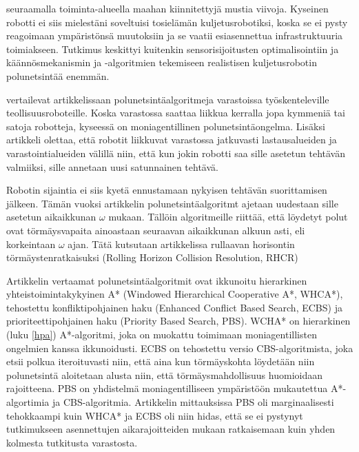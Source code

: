 seuraamalla toiminta-alueella maahan kiinnitettyjä mustia viivoja. Kyseinen 
robotti ei siis mielestäni soveltuisi tosielämän kuljetusrobotiksi, koska se 
ei pysty reagoimaan ympäristönsä muutoksiin ja se vaatii esiasennettua 
infrastruktuuria toimiakseen. Tutkimus keskittyi kuitenkin sensorisijoitusten 
optimalisointiin ja käännösmekanismin ja -algoritmien tekemiseen realistisen 
kuljetusrobotin polunetsintää enemmän. \par
	\textcite{warehouse} vertailevat artikkelissaan 
polunetsintäalgoritmeja varastoissa työskenteleville teollisuusroboteille. 
Koska varastossa saattaa liikkua kerralla jopa kymmeniä tai satoja robotteja, 
kyseessä on moniagentillinen polunetsintäongelma. Lisäksi artikkeli olettaa, 
että robotit liikkuvat varastossa jatkuvasti lastausalueiden ja 
varastointialueiden välillä niin, että kun jokin robotti saa sille asetetun 
tehtävän valmiiksi, sille annetaan uusi satunnainen tehtävä. \par
	Robotin sijaintia ei siis kyetä ennustamaan nykyisen tehtävän 
suorittamisen jälkeen. Tämän vuoksi artikkelin polunetsintäalgoritmt ajetaan 
uudestaan sille asetetun aikaikkunan $\omega$ mukaan. Tällöin algoritmeille 
riittää, että löydetyt polut ovat törmäysvapaita ainoastaan seuraavan 
aikaikkunan alkuun asti, eli korkeintaan $\omega$ ajan. Tätä kutsutaan 
artikkelissa rullaavan horisontin törmäystenratkaisuksi (Rolling Horizon 
Collision Resolution, RHCR) \par
	Artikkelin vertaamat polunetsintäalgoritmit ovat ikkunoitu 
hierarkinen yhteistoimintakykyinen A* (Windowed Hierarchical Cooperative A*, 
WHCA*), tehostettu konfliktipohjainen haku (Enhanced Conflict Based Search, 
ECBS) ja prioriteettipohjainen haku (Priority Based Search, PBS). WCHA* on 
hierarkinen (luku \ref{hpa}) A*-algoritmi, joka on muokattu toimimaan 
moniagentillisten ongelmien kanssa ikkunoidusti. ECBS on tehostettu versio 
CBS-algoritmista, joka etsii polkua iteroituvasti niin, että aina kun 
törmäyskohta löydetään niin polunetsintä aloitetaan alusta niin, että 
törmäysmahdollisuus huomioidaan rajoitteena. PBS on yhdistelmä 
moniagentilliseen ympäristöön mukautettua A*-algortimia ja CBS-algoritmia. 
Artikkelin mittauksissa PBS oli marginaalisesti tehokkaampi kuin WHCA* ja 
ECBS oli niin hidas, että se ei pystynyt tutkimukseen asennettujen 
aikarajoitteiden mukaan ratkaisemaan kuin yhden kolmesta tutkitusta 
varastosta.
